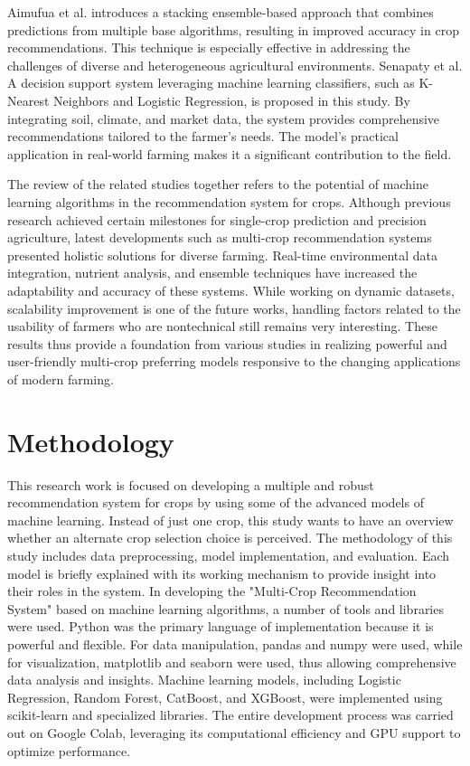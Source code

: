 \documentclass[conference]{IEEEtran}
\begin{document}
Aimufua et al. \cite{aimufua2024stacking} introduces a stacking ensemble-based approach that combines predictions from multiple base algorithms, resulting in improved accuracy in crop recommendations. This technique is especially effective in addressing the challenges of diverse and heterogeneous agricultural environments.  Senapaty et al. \cite{senapaty2024decision} A decision support system leveraging machine learning classifiers, such as K-Nearest Neighbors and Logistic Regression, is proposed in this study. By integrating soil, climate, and market data, the system provides comprehensive recommendations tailored to the farmer's needs. The model's practical application in real-world farming makes it a significant contribution to the field. 



The review of the related studies together refers to the potential of machine learning algorithms in the recommendation system for crops. Although previous research achieved certain milestones for single-crop prediction and precision agriculture, latest developments such as multi-crop recommendation systems presented holistic solutions for diverse farming. Real-time environmental data integration, nutrient analysis, and ensemble techniques have increased the adaptability and accuracy of these systems. While working on dynamic datasets, scalability improvement is one of the future works, handling factors related to the usability of farmers who are nontechnical still remains very interesting. These results thus provide a foundation from various studies in realizing powerful and user-friendly multi-crop preferring models responsive to the changing applications of modern farming.


\section{Methodology}
This research work is focused on developing a multiple and robust recommendation system for crops by using some of the advanced models of machine learning. Instead of just one crop, this study wants to have an overview whether an alternate crop selection choice is perceived. The methodology of this study includes data preprocessing, model implementation, and evaluation. Each model is briefly explained with its working mechanism to provide insight into their roles in the system.
In developing the "Multi-Crop Recommendation System" based on machine learning algorithms, a number of tools and libraries were used. Python was the primary language of implementation because it is powerful and flexible. For data manipulation, pandas and numpy were used, while for visualization, matplotlib and seaborn were used, thus allowing comprehensive data analysis and insights. Machine learning models, including Logistic Regression, Random Forest, CatBoost, and XGBoost, were implemented using scikit-learn and specialized libraries. The entire development process was carried out on Google Colab, leveraging its computational efficiency and GPU support to optimize performance.
\end{document}
